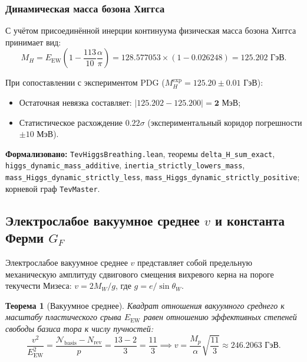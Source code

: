 \documentclass[11pt,a4paper]{article}
\newtheorem{theorem}{Теорема}
\theoremstyle{definition}
\theoremstyle{remark}
\begin{document}
\subsubsection{Динамическая масса бозона Хиггса}

С учётом присоединённой инерции континуума физическая масса бозона Хиггса принимает вид:
\begin{equation}
M_H = E_{\mathrm{EW}} \left(1 - \frac{113}{10} \frac{\alpha}{\pi}\right) = 128.577053 \times \left(1 - 0.026248\right) = \mathbf{125.202 \text{ ГэВ}}.
\end{equation}

При сопоставлении с экспериментом PDG ($M_H^{\mathrm{exp}} = 125.20 \pm 0.01\text{ ГэВ}$):
\begin{itemize}
    \item Остаточная невязка составляет: $|125.202 - 125.200| = \mathbf{2\text{ МэВ}}$;
    \item Статистическое расхождение $0.22\sigma$ (экспериментальный коридор погрешности $\pm 10\text{ МэВ}$).
\end{itemize}

\noindent\small\textbf{Формализовано:} \texttt{TevHiggsBreathing.lean}, теоремы \texttt{delta\_H\_sum\_exact}, \texttt{higgs\_dynamic\_mass\_additive}, \texttt{inertia\_strictly\_lowers\_mass}, \texttt{mass\_Higgs\_dynamic\_strictly\_less}, \texttt{mass\_Higgs\_dynamic\_strictly\_positive}; корневой граф \texttt{TevMaster}.

\subsection{Электрослабое вакуумное среднее $v$ и константа Ферми $G_F$}
	
Электрослабое вакуумное среднее $v$ представляет собой предельную механическую амплитуду сдвигового смещения вихревого керна на пороге текучести Мизеса: $v = 2 M_W / g$, где $g = e / \sin\theta_W$.
	
\begin{theorem}[Вакуумное среднее]
\label{thm:vev_exact_ratio}
Квадрат отношения вакуумного среднего к масштабу пластического срыва $E_{\mathrm{EW}}$ равен отношению эффективных степеней свободы базиса тора к числу пучностей:
\begin{equation}
	\frac{v^2}{E_{\mathrm{EW}}^2} = \frac{\mathcal{N}_{\mathrm{basis}} - N_{\mathrm{rev}}}{p} = \frac{13 - 2}{3} = \frac{11}{3} \implies v = \frac{M_p}{\alpha} \sqrt{\frac{11}{3}} \approx 246.2063\text{ ГэВ}.
\label{eq:vev_ratio_exact}
\end{equation}
\end{theorem}
\end{document}
